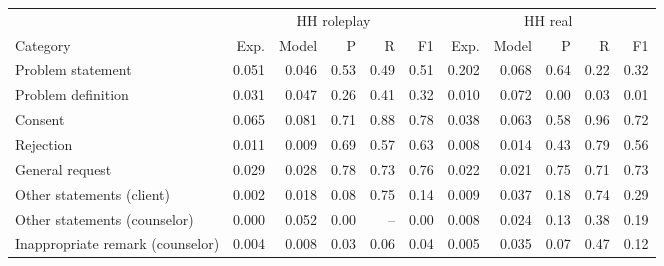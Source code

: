 \begin{tabular}{lrrrrrrrrrr}
\toprule
& \multicolumn{5}{c}{HH roleplay} & \multicolumn{5}{c}{HH real} \\
\cmidrule(lr){2-6}\cmidrule(lr){7-11}
Category & Exp. & Model & P & R & F1 & Exp. & Model & P & R & F1 \\
\midrule
Problem statement & 0.051 & 0.046 & 0.53 & 0.49 & 0.51 & 0.202 & 0.068 & 0.64 & 0.22 & 0.32 \\
Problem definition & 0.031 & 0.047 & 0.26 & 0.41 & 0.32 & 0.010 & 0.072 & 0.00 & 0.03 & 0.01 \\
Consent & 0.065 & 0.081 & 0.71 & 0.88 & 0.78 & 0.038 & 0.063 & 0.58 & 0.96 & 0.72 \\
Rejection & 0.011 & 0.009 & 0.69 & 0.57 & 0.63 & 0.008 & 0.014 & 0.43 & 0.79 & 0.56 \\
General request & 0.029 & 0.028 & 0.78 & 0.73 & 0.76 & 0.022 & 0.021 & 0.75 & 0.71 & 0.73 \\
Other statements (client) & 0.002 & 0.018 & 0.08 & 0.75 & 0.14 & 0.009 & 0.037 & 0.18 & 0.74 & 0.29 \\
Other statements (counselor) & 0.000 & 0.052 & 0.00 & -- & 0.00 & 0.008 & 0.024 & 0.13 & 0.38 & 0.19 \\
Inappropriate remark (counselor) & 0.004 & 0.008 & 0.03 & 0.06 & 0.04 & 0.005 & 0.035 & 0.07 & 0.47 & 0.12 \\
\bottomrule
\end{tabular}
